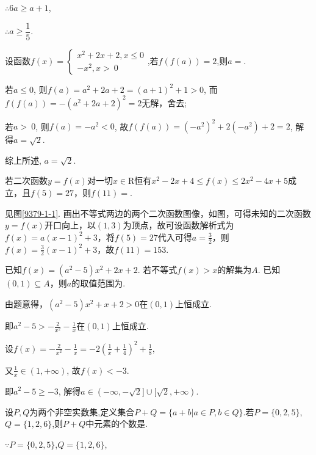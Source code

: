 \documentclass[cs4size,windows,a4paper,answers]{BHCexam}
\begin{document}
\begin{groups}
\begin{questions}[]
\begin{solution}
$\therefore{}6a\geqslant{}a+1$,

$\therefore{}a\geqslant{}\dfrac{1}{5}$.

\end{solution}
\question[5] 设函数$f(x)=\begin{cases}x^2+2x+2,x\leqslant{}0\\-x^2,x\gt\ 0\end{cases}$,若$f(f(a))=2$,则$a=$\mtk{}.
\begin{solution}
\methodonly
若$a\leqslant{}0$, 
则$f(a)=a^2+2a+2=(a+1)^2+1 \gt 0$, 
而$f(f(a))=-(a^2+2a+2)^2=2$无解，舍去;

若$a\gt\ 0$,
则$f(a)=-a^2\lt 0$,
故$f(f(a))=(-a^2)^2+2(-a^2)+2=2$,
解得$a=\sqrt{2}$.

综上所述, $a=\sqrt{2}$.


\end{solution}
\question[5] 若二次函数$y=f(x)$对一切$x\in \text{R}$恒有${{x}^{2}}-2x+4\le f(x)\le 2{{x}^{2}}-4x+5$成立，且$f(5)=27$，则$f(11)=$.
\begin{solution}
\methodonly
见图\ref{9379-1-1}.
画出不等式两边的两个二次函数图像，如图，可得未知的二次函数$y=f(x)$开口向上，以$(1,3)$为顶点，故可设函数解析式为$f(x)=a(x-1)^2+3$，将$f(5)=27$代入可得$a=\frac{3}{2}$，则$f(x)=\frac{3}{2}(x-1)^2+3$，故$f(11)=153$.

\end{solution}
\question[5] 已知$f(x)=(a^2-5)x^2+2x+2$. 若不等式$f(x) \gt x$的解集为$A$. 已知$(0,1)\subseteq A$，则$a$的取值范围为\mtk{$a \in (-\infty,-\sqrt{2}]\cup[\sqrt{2},+\infty)$}.
\begin{solution}
\methodonly
由题意得，$(a^2-5)x^2+x+2 \gt 0$在$(0,1)$上恒成立.

即$a^2-5 \gt -\frac{2}{x^2}-\frac{1}{x}$在$(0,1)$上恒成立.

设$f(x)=-\frac{2}{x^2}-\frac{1}{x}=-2(\frac{1}{x}+\frac{1}{4})^2+\frac{1}{8}$, 

又$\frac{1}{x}\in(1,+\infty)$, 故$f(x) \lt -3$.

即$a^2-5 \ge -3$, 解得$a \in (-\infty,-\sqrt{2}]\cup[\sqrt{2},+\infty)$.


\end{solution}
\end{questions}
\begin{questions}[]
\question[5] 设$P,Q$为两个非空实数集,定义集合$P+Q=\{a+b|a\in{P},b\in{Q}\}$.若$P=\{0,2,5\}$,$Q=\{1,2,6\}$,则$P+Q$中元素的个数是.

\begin{solution}
\methodonly
$\because P=\{0,2,5\}$,$Q=\{1,2,6\}$,


\end{solution}
\end{questions}
\end{groups}
\end{document}

